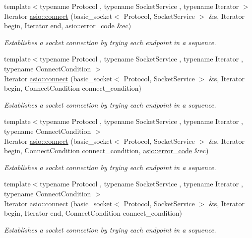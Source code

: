 \begin{DoxyCompactItemize}
{\footnotesize template$<$typename Protocol , typename Socket\+Service , typename Iterator $>$ }\\Iterator \hyperlink{group__connect_ga6cc8005658c5ece3566508bc108d4c83}{asio\+::connect} (basic\+\_\+socket$<$ Protocol, Socket\+Service $>$ \&s, Iterator begin, Iterator end, \hyperlink{classasio_1_1error__code}{asio\+::error\+\_\+code} \&ec)
\begin{DoxyCompactList}\small\item\em Establishes a socket connection by trying each endpoint in a sequence. \end{DoxyCompactList}\item 
{\footnotesize template$<$typename Protocol , typename Socket\+Service , typename Iterator , typename Connect\+Condition $>$ }\\Iterator \hyperlink{group__connect_ga9a192c653d045eaa7c8c7817316a52b5}{asio\+::connect} (basic\+\_\+socket$<$ Protocol, Socket\+Service $>$ \&s, Iterator begin, Connect\+Condition connect\+\_\+condition)
\begin{DoxyCompactList}\small\item\em Establishes a socket connection by trying each endpoint in a sequence. \end{DoxyCompactList}\item 
{\footnotesize template$<$typename Protocol , typename Socket\+Service , typename Iterator , typename Connect\+Condition $>$ }\\Iterator \hyperlink{group__connect_gab16905fe7662fdaa7410ea98e4a5d38a}{asio\+::connect} (basic\+\_\+socket$<$ Protocol, Socket\+Service $>$ \&s, Iterator begin, Connect\+Condition connect\+\_\+condition, \hyperlink{classasio_1_1error__code}{asio\+::error\+\_\+code} \&ec)
\begin{DoxyCompactList}\small\item\em Establishes a socket connection by trying each endpoint in a sequence. \end{DoxyCompactList}\item 
{\footnotesize template$<$typename Protocol , typename Socket\+Service , typename Iterator , typename Connect\+Condition $>$ }\\Iterator \hyperlink{group__connect_ga85284052d2233e8ea3993625e9f28184}{asio\+::connect} (basic\+\_\+socket$<$ Protocol, Socket\+Service $>$ \&s, Iterator begin, Iterator end, Connect\+Condition connect\+\_\+condition)
\begin{DoxyCompactList}\small\item\em Establishes a socket connection by trying each endpoint in a sequence. \end{DoxyCompactList}\item 

\end{DoxyCompactItemize}
